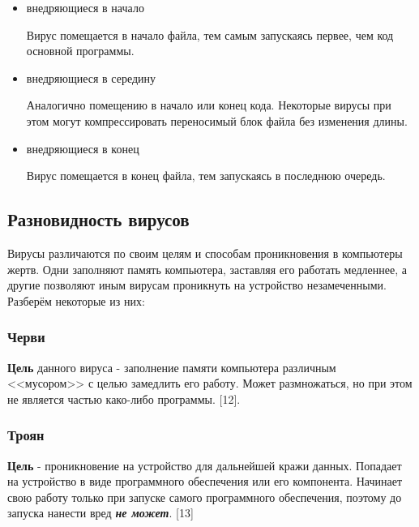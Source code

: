 \documentclass[12pt]{article}
\begin{document}
\begin{itemize}
    \item внедряющиеся в начало
        \begin{flushleft}
            Вирус помещается в начало файла, тем самым запускаясь первее, чем код основной программы.
        \end{flushleft}
    \item внедряющиеся в середину
        \begin{flushleft}
            Аналогично помещению в начало или конец кода. Некоторые вирусы при этом могут компрессировать переносимый блок файла без изменения длины.
        \end{flushleft}
    \item внедряющиеся в конец
        \begin{flushleft}
            Вирус помещается в конец файла, тем запускаясь в последнюю очередь.
        \end{flushleft}
\end{itemize}

\subsection*{Разновидность вирусов}
Вирусы различаются по своим целям и способам проникновения в компьютеры жертв. Одни заполняют память компьютера, заставляя его работать медленнее, а другие позволяют иным вирусам проникнуть на устройство незамеченными. Разберём некоторые из них:

\subsubsection*{Черви}
\textbf{Цель} данного вируса - заполнение памяти компьютера различным <<мусором>> с целью замедлить его работу. Может размножаться, но при этом не является частью како-либо программы. [12].

\subsubsection*{Троян}
\textbf{Цель} - проникновение на устройство для дальнейшей кражи данных. Попадает на устройство в виде программного обеспечения или его компонента. Начинает свою работу только при запуске самого программного обеспечения, поэтому до запуска нанести вред \textbf{\textit{не может}}. [13]
\end{document}
